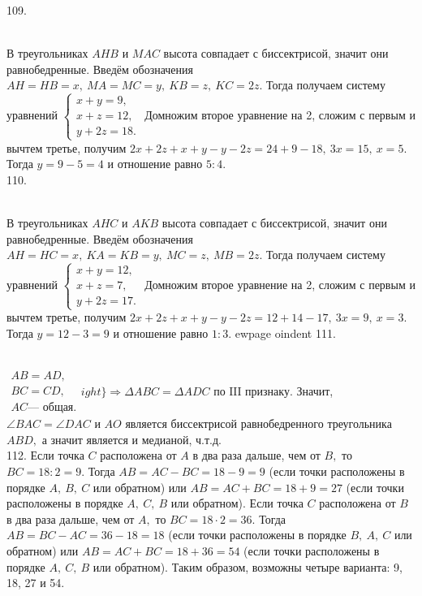 109. \begin{figure}[ht!]
\end{figure}\\
В треугольниках $AHB$ и $MAC$ высота совпадает с биссектрисой, значит они равнобедренные. Введём обозначения $AH=HB=x,\ MA=MC=y,\ KB=z,\ KC=2z.$ Тогда получаем систему уравнений $\begin{cases} x+y=9,\\ x+z=12,\\ y+2z=18.\end{cases}$ Домножим второе уравнение на 2, сложим с первым и вычтем третье, получим $2x+2z+x+y-y-2z=24+9-18,\ 3x=15,\ x=5.$ Тогда $y=9-5=4$ и отношение равно $5:4.$\\
110. \begin{figure}[ht!]
\end{figure}\\
В треугольниках $AHC$ и $AKB$ высота совпадает с биссектрисой, значит они равнобедренные. Введём обозначения $AH=HC=x,\ KA=KB=y,\ MC=z,\ MB=2z.$ Тогда получаем систему уравнений $\begin{cases} x+y=12,\\ x+z=7,\\ y+2z=17.\end{cases}$ Домножим второе уравнение на 2, сложим с первым и вычтем третье, получим $2x+2z+x+y-y-2z=12+14-17,\ 3x=9,\ x=3.$ Тогда $y=12-3=9$ и отношение равно $1:3.$
ewpage
oindent
111. \begin{figure}[ht!]
\end{figure}\\
$\left.\begin{array}{l}AB=AD,\\
BC=CD,\\
AC\text{--- общая.}  \end{array}
ight\}\Rightarrow \Delta ABC=\Delta ADC\text{ по III признаку.}$ Значит, $\angle BAC=\angle DAC$ и $AO$ является биссектрисой равнобедренного треугольника $ABD,$ а значит является и медианой, ч.т.д.\\
112. Если точка $C$ расположена от $A$ в два раза дальше, чем от $B,$ то $BC=18:2=9.$ Тогда $AB=AC-BC=18-9=9$ (если точки расположены в порядке $A,\ B,\ C$ или обратном) или $AB=AC+BC=18+9=27$ (если точки расположены в порядке $A,\ C,\ B$ или обратном). Если точка $C$ расположена от $B$ в два раза дальше, чем от $A,$ то $BC=18\cdot2=36.$ Тогда $AB=BC-AC=36-18=18$ (если точки расположены в порядке $B,\ A,\ C$ или обратном) или $AB=AC+BC=18+36=54$ (если точки расположены в порядке $A,\ C,\ B$ или обратном). Таким образом, возможны четыре варианта: 9, 18, 27 и 54.\\
